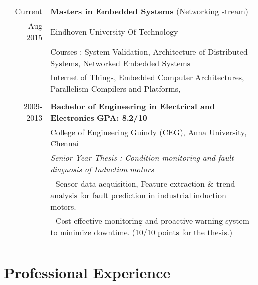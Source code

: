 \documentclass[a4paper,10pt]{article} %
\begin{document}
\begin{tabular}{rl}	
\ Current & \textbf{Masters in Embedded Systems} \footnotesize{(Networking stream)}\\
\ Aug 2015 & Eindhoven University Of Technology\\
& \footnotesize{Courses : System Validation, Architecture of Distributed Systems, Networked Embedded Systems}\\
& \footnotesize{Internet of Things, Embedded Computer Architectures, Parallelism Compilers and Platforms,}\\ 
&\\
\ 2009-2013 & \textbf{Bachelor of Engineering in Electrical and Electronics} \hfill \textbf{GPA: 8.2/10}\\
& College of Engineering Guindy (CEG), Anna University, Chennai\\
&  \emph{Senior Year Thesis : Condition monitoring and fault diagnosis of Induction motors}\\
&  \footnotesize{ - Sensor data acquisition, Feature extraction \& trend analysis for fault prediction in industrial induction motors.}\\
& \footnotesize{ - Cost effective monitoring and proactive warning system to minimize downtime. (10/10 points for the thesis.)}\\
&\\


\end{tabular}
\section{Professional Experience}
\end{document}
